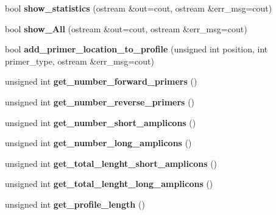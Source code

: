 \begin{DoxyCompactItemize}
bool {\bfseries show\+\_\+statistics} (ostream \&out=cout, ostream \&err\+\_\+msg=cout)
\item 
\mbox{\label{class_p_c_r___profile_aad744529e3bbcdc019d259667460340b}} 
bool {\bfseries show\+\_\+\+All} (ostream \&out=cout, ostream \&err\+\_\+msg=cout)
\item 
\mbox{\label{class_p_c_r___profile_a95758e5dff688b7b85bd1009ba28e112}} 
bool {\bfseries add\+\_\+primer\+\_\+location\+\_\+to\+\_\+profile} (unsigned int position, int primer\+\_\+type, ostream \&err\+\_\+msg=cout)
\item 
\mbox{\label{class_p_c_r___profile_a5222753c5f4b1568f7254be8fbc7c862}} 
unsigned int {\bfseries get\+\_\+number\+\_\+forward\+\_\+primers} ()
\item 
\mbox{\label{class_p_c_r___profile_a5470c4248e9c347b66ee1ad977d2a6f9}} 
unsigned int {\bfseries get\+\_\+number\+\_\+reverse\+\_\+primers} ()
\item 
\mbox{\label{class_p_c_r___profile_ae1470db4482cb29be8e29b96f913023c}} 
unsigned int {\bfseries get\+\_\+number\+\_\+short\+\_\+amplicons} ()
\item 
\mbox{\label{class_p_c_r___profile_a91a98d9005a63450de3f782c9374972a}} 
unsigned int {\bfseries get\+\_\+number\+\_\+long\+\_\+amplicons} ()
\item 
\mbox{\label{class_p_c_r___profile_aa8f3e8fc43865af8734090436a0d729e}} 
unsigned int {\bfseries get\+\_\+total\+\_\+lenght\+\_\+short\+\_\+amplicons} ()
\item 
\mbox{\label{class_p_c_r___profile_adf41a697d05489582745d650d4e7c956}} 
unsigned int {\bfseries get\+\_\+total\+\_\+lenght\+\_\+long\+\_\+amplicons} ()
\item 
\mbox{\label{class_p_c_r___profile_ad25903940b769ad48abaf472175e5ccf}} 
unsigned int {\bfseries get\+\_\+profile\+\_\+length} ()
\item 
\mbox{\label{class_p_c_r___profile_a0c37a463d8adedb60c5b4d8d213c182e}} 

\end{DoxyCompactItemize}
